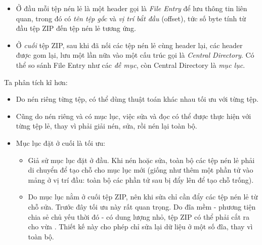 \documentclass[../../thesis]{subfiles}
\begin{document}
\begin{itemize}[resume, before = \vspace*{-\dimexpr\topsep+\partopsep\relax}]
    \item
        Ở đầu mỗi tệp nén lẻ là một header gọi là \emph{File Entry} để lưu thông
        tin liên quan, trong đó có \emph{tên tệp gốc} và \emph{vị trí bắt đầu}
        (offset), tức số byte tính từ đầu tệp ZIP đến tệp nén lẻ tương ứng.
    \item
        Ở \emph{cuối} tệp ZIP, sau khi đã nối các tệp nén lẻ cùng header lại,
        các header được gom lại, lưu một lần nữa vào một cấu trúc gọi là
        \emph{Central Directory}. Có thể so sánh File Entry như các \emph{đề
        mục}, còn Central Directory là \emph{mục lục}.
\end{itemize}

Ta phân tích kĩ hơn:

\begin{itemize}
    \item
        Do nén riêng từng tệp, có thể dùng thuật toán khác nhau tối ưu với từng
        tệp.
    \item
        Cũng do nén riêng và có mục lục, việc sửa và đọc có thể được thực hiện
        với từng tệp lẻ, thay vì phải giải nén, sửa, rồi nén lại toàn bộ.
\end{itemize}

\begin{itemize}[resume, before = \vspace*{-\dimexpr\topsep+\partopsep\relax}]
    \item
        Mục lục đặt ở cuối là tối ưu:

        \begin{itemize}
            \item
                Giả sử mục lục đặt ở đầu. Khi nén hoặc sửa, toàn bộ các tệp nén
                lẻ phải di chuyển để tạo chỗ cho mục lục mới (giống như thêm một
                phần tử vào mảng ở vị trí đầu: toàn bộ các phần tử sau bị đẩy
                lên để tạo chỗ trống).
            \item
                Do mục lục nằm ở cuối tệp ZIP, nên khi sửa chỉ cần đẩy các tệp
                nén lẻ từ chỗ sửa. Trước đây tối ưu này rất quan trọng. Do đĩa
                mềm - phương tiện chia sẻ chủ yếu thời đó - có dung lượng nhỏ,
                tệp ZIP có thể phải cắt ra cho vừa \cite{WIKI_ZIP}. Thiết kế này
                cho phép chỉ sửa lại dữ liệu ở một số đĩa, thay vì toàn bộ.
        \end{itemize}
\end{itemize}
\end{document}
